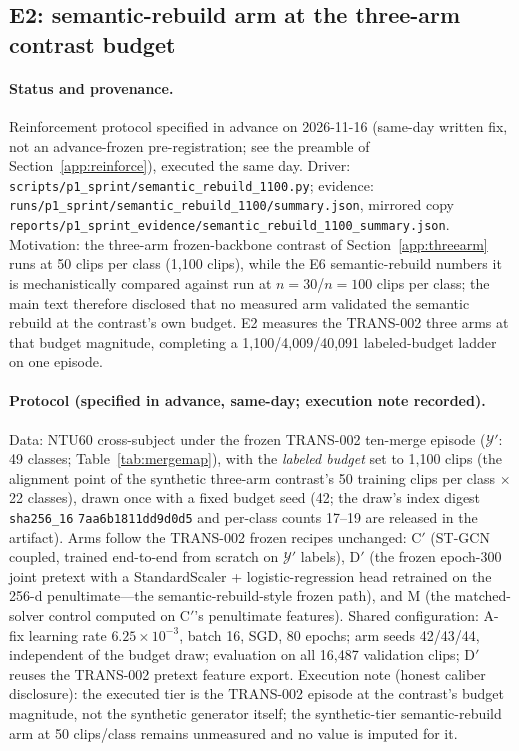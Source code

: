\documentclass[11pt,a4paper]{article}
\begin{document}
\subsection{E2: semantic-rebuild arm at the three-arm contrast budget}\label{app:rebuildbudget}

\paragraph{Status and provenance.}
Reinforcement protocol specified in advance on 2026-11-16 (same-day written fix, not an advance-frozen pre-registration; see the preamble of Section~\ref{app:reinforce}), executed the same day. Driver: \texttt{scripts/p1\_sprint/semantic\_rebuild\_1100.py}; evidence: \texttt{runs/p1\_sprint/semantic\_rebuild\_1100/summary.json}, mirrored copy \texttt{reports/p1\_sprint\_evidence/semantic\_rebuild\_1100\_summary.json}. Motivation: the three-arm frozen-backbone contrast of Section~\ref{app:threearm} runs at 50 clips per class (1{,}100 clips), while the E6 semantic-rebuild numbers it is mechanistically compared against run at $n{=}30$/$n{=}100$ clips per class; the main text therefore disclosed that no measured arm validated the semantic rebuild at the contrast's own budget. E2 measures the TRANS-002 three arms at that budget magnitude, completing a 1{,}100/4{,}009/40{,}091 labeled-budget ladder on one episode.

\paragraph{Protocol (specified in advance, same-day; execution note recorded).}
Data: NTU60 cross-subject under the frozen TRANS-002 ten-merge episode ($\mathcal{Y}'$: 49 classes; Table~\ref{tab:mergemap}), with the \emph{labeled budget} set to 1{,}100 clips (the alignment point of the synthetic three-arm contrast's 50 training clips per class $\times$ 22 classes), drawn once with a fixed budget seed (42; the draw's index digest \texttt{sha256\_16} \texttt{7aa6b1811dd9d0d5} and per-class counts 17--19 are released in the artifact). Arms follow the TRANS-002 frozen recipes unchanged: C$'$ (ST-GCN coupled, trained end-to-end from scratch on $\mathcal{Y}'$ labels), D$'$ (the frozen epoch-300 joint pretext with a StandardScaler + logistic-regression head retrained on the 256-d penultimate---the semantic-rebuild-style frozen path), and M (the matched-solver control computed on C$'$'s penultimate features). Shared configuration: A-fix learning rate $6.25\times10^{-3}$, batch 16, SGD, 80 epochs; arm seeds 42/43/44, independent of the budget draw; evaluation on all 16{,}487 validation clips; D$'$ reuses the TRANS-002 pretext feature export. Execution note (honest caliber disclosure): the executed tier is the TRANS-002 episode at the contrast's budget magnitude, not the synthetic generator itself; the synthetic-tier semantic-rebuild arm at 50 clips/class remains unmeasured and no value is imputed for it.
\end{document}
